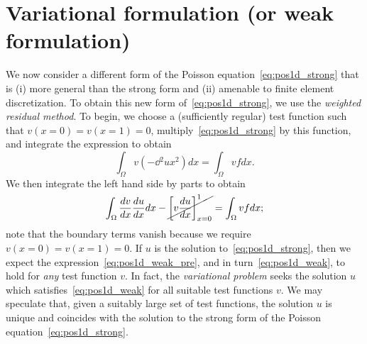 
\section{Variational formulation (or weak formulation)}
\label{sec:pos1d_var}
We now consider a different form of the Poisson equation~\eqref{eq:pos1d_strong} that is (i) more general than the strong form and (ii) amenable to finite element discretization. To obtain this new form of~\eqref{eq:pos1d_strong}, we use the \emph{weighted residual method}. To begin, we choose a (sufficiently regular) test function such that $v(x=0) = v(x=1) = 0$, multiply~\eqref{eq:pos1d_strong} by this function, and integrate the expression to obtain
\begin{equation}
  \int_\Omega v \left( -\dd{^2u}{x^2} \right) dx = \int_\Omega v f dx.
  \label{eq:pos1d_weak_pre}
\end{equation}
We then integrate the left hand side by parts to obtain
\begin{equation}
  \int_\Omega \frac{d v}{d x} \frac{d u}{d x} dx - \cancel{ \left[ v \frac{d u}{d x} \right]_{x=0}^1} = \int_\Omega v f dx;
  \label{eq:pos1d_weak}
\end{equation}
note that the boundary terms vanish because we require $v(x=0) = v(x=1) = 0$. If $u$ is the solution to~\eqref{eq:pos1d_strong}, then we expect the expression~\eqref{eq:pos1d_weak_pre}, and in turn~\eqref{eq:pos1d_weak}, to hold for \emph{any} test function $v$.  In fact, the \emph{variational problem} seeks the solution $u$ which satisfies~\eqref{eq:pos1d_weak} for all suitable test functions $v$.  We may speculate that, given a suitably large set of test functions, the solution $u$ is unique and coincides with the solution to the strong form of the Poisson equation~\eqref{eq:pos1d_strong}.  

